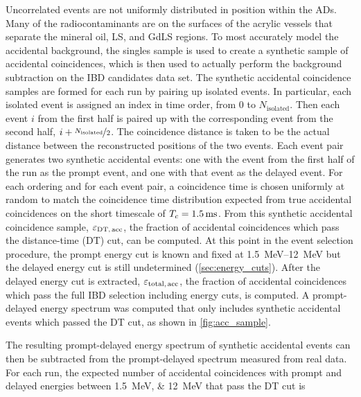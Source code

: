 Uncorrelated events are not uniformly distributed
in position within the ADs.
Many of the radiocontaminants are on the surfaces of the
acrylic vessels that separate the mineral oil, LS, and GdLS regions.
To most accurately model the accidental background,
the singles sample is used to create a synthetic sample of accidental coincidences,
which is then used to actually perform the background subtraction
on the IBD candidates data set.
The synthetic accidental coincidence samples are formed for each run
by pairing up isolated events.
In particular, each isolated event is assigned an index in time order,
from $0$ to $N_{\text{isolated}}$.
Then each event $i$ from the first half is paired up with
the corresponding event from the second half, $i + \nicefrac{N_{\text{isolated}}}{2}$.
The coincidence distance is taken to be the actual distance
between the reconstructed positions of the two events.
Each event pair generates two synthetic accidental events:
one with the event from the first half of the run as the prompt event,
and one with that event as the delayed event.
For each ordering and for each event pair, a coincidence time is chosen
uniformly at random to match the coincidence time distribution
expected from true accidental coincidences on the short timescale
of $T_c=\SI{1.5}{\milli\second}$.
From this synthetic accidental coincidence sample, $\varepsilon_{\text{DT,\,acc}}$,
the fraction of accidental  coincidences which pass the distance-time (DT) cut,
can be computed.
At this point in the event selection procedure,
the prompt energy cut is known and fixed at \SIrange{1.5}{12}{\MeV}
but the delayed energy cut is still undetermined (\cref{sec:energy_cuts}).
After the delayed energy cut is extracted, $\varepsilon_{\text{total,\,acc}}$,
the fraction of accidental  coincidences
which pass the full IBD selection including energy cuts,
is computed.
A prompt-delayed energy spectrum was computed that only includes
synthetic accidental events which passed the DT cut,
as shown in \cref{fig:acc_sample}.

The resulting prompt-delayed energy spectrum of synthetic accidental events
can then be subtracted
from the prompt-delayed spectrum measured from real data.
For each run, the expected number of accidental coincidences
with prompt and delayed energies between \SIlist{1.5;12}{\MeV}
that pass the DT cut is

